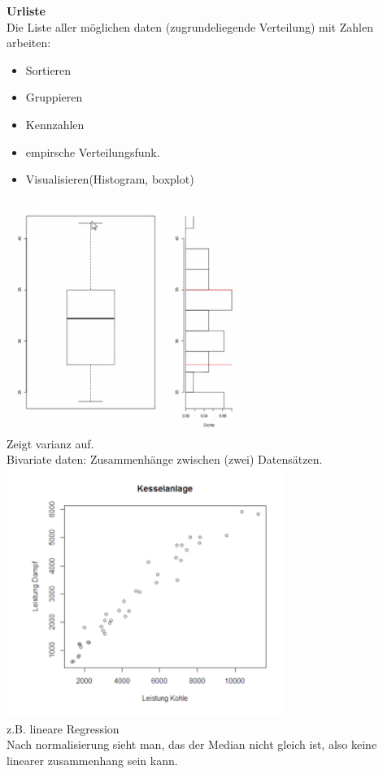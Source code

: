 \documentclass{article}
\begin{document}
	\textbf{Urliste}\\
	Die Liste aller möglichen daten (zugrundeliegende Verteilung)
	mit Zahlen arbeiten:
	\begin{itemize}
		\item Sortieren
		\item Gruppieren
		\item Kennzahlen
		\item empirsche Verteilungsfunk.
		\item Visualisieren(Histogram, boxplot)
	\end{itemize}
	\includegraphics[width=256pt]{Boxplot.png}\\
	Zeigt varianz auf.\\
	Bivariate daten: Zusammenhänge zwischen (zwei) Datensätzen.\\
	\includegraphics[width=256pt]{bivariat.png}\\
	z.B. lineare Regression\\
	Nach normalisierung sieht man, das der Median nicht gleich ist, also keine linearer zusammenhang sein kann.
\end{document}

